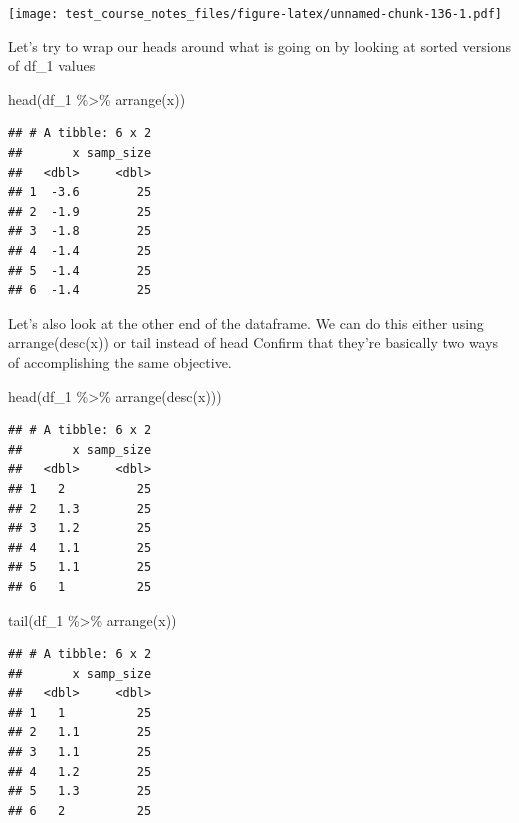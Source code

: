 \documentclass[
]{book}
\newenvironment{Shaded}{\begin{snugshade}}{\end{snugshade}}
\newcommand{\FunctionTok}[1]{\textcolor[rgb]{0.00,0.00,0.00}{#1}}
\newcommand{\NormalTok}[1]{#1}
\newcommand{\SpecialCharTok}[1]{\textcolor[rgb]{0.00,0.00,0.00}{#1}}
\begin{document}
\texttt{[image: test\_course\_notes\_files/figure-latex/unnamed-chunk-136-1.pdf]}

Let's try to wrap our heads around what is going on by looking at sorted versions of df\_1 values

\begin{Shaded}
\begin{Highlighting}[]
\FunctionTok{head}\NormalTok{(df\_1 }\SpecialCharTok{\%\textgreater{}\%} \FunctionTok{arrange}\NormalTok{(x))}
\end{Highlighting}
\end{Shaded}

\begin{verbatim}
## # A tibble: 6 x 2
##       x samp_size
##   <dbl>     <dbl>
## 1  -3.6        25
## 2  -1.9        25
## 3  -1.8        25
## 4  -1.4        25
## 5  -1.4        25
## 6  -1.4        25
\end{verbatim}

Let's also look at the other end of the dataframe. We can do this either using arrange(desc(x)) or tail instead of head
Confirm that they're basically two ways of accomplishing the same objective.

\begin{Shaded}
\begin{Highlighting}[]
\FunctionTok{head}\NormalTok{(df\_1 }\SpecialCharTok{\%\textgreater{}\%} \FunctionTok{arrange}\NormalTok{(}\FunctionTok{desc}\NormalTok{(x)))}
\end{Highlighting}
\end{Shaded}

\begin{verbatim}
## # A tibble: 6 x 2
##       x samp_size
##   <dbl>     <dbl>
## 1   2          25
## 2   1.3        25
## 3   1.2        25
## 4   1.1        25
## 5   1.1        25
## 6   1          25
\end{verbatim}

\begin{Shaded}
\begin{Highlighting}[]
\FunctionTok{tail}\NormalTok{(df\_1 }\SpecialCharTok{\%\textgreater{}\%} \FunctionTok{arrange}\NormalTok{(x))}
\end{Highlighting}
\end{Shaded}

\begin{verbatim}
## # A tibble: 6 x 2
##       x samp_size
##   <dbl>     <dbl>
## 1   1          25
## 2   1.1        25
## 3   1.1        25
## 4   1.2        25
## 5   1.3        25
## 6   2          25
\end{verbatim}
\end{document}
